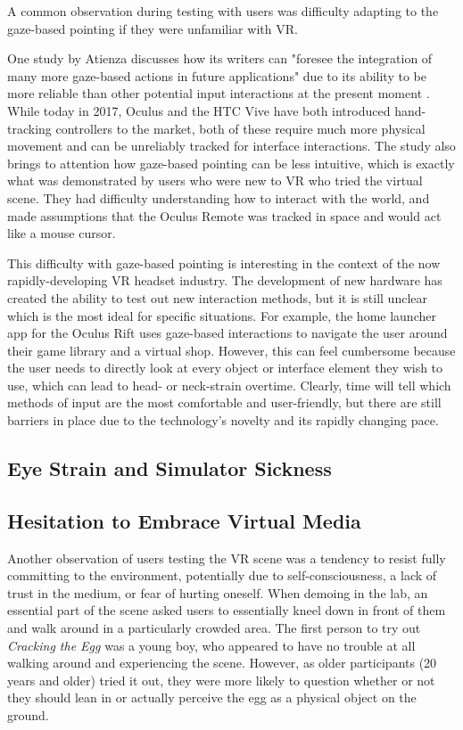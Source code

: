 \documentclass[10pt,twocolumn,letterpaper]{article}
\begin{document}
A common observation during testing with users was difficulty adapting to the gaze-based pointing if they were unfamiliar with VR.

One study by Atienza \etal discusses how its writers can "foresee the integration of many more gaze-based actions in future applications" due to its ability to be more reliable than other potential input interactions at the present moment \cite{7519387}. While today in 2017, Oculus and the HTC Vive have both introduced hand-tracking controllers to the market, both of these require much more physical movement and can be unreliably tracked for interface interactions. The study also brings to attention how  gaze-based pointing can be less intuitive, which is exactly what was demonstrated by users who were new to VR who tried the virtual scene. They had difficulty understanding how to interact with the world, and made assumptions that the Oculus Remote was tracked in space and would act like a mouse cursor.

This difficulty with gaze-based pointing is interesting in the context of the now rapidly-developing VR headset industry. The development of new hardware has created the ability to test out new interaction methods, but it is still unclear which is the most ideal for specific situations. For example, the home launcher app for the Oculus Rift uses gaze-based interactions to navigate the user around their game library and a virtual shop. However, this can feel cumbersome because the user needs to directly look at every object or interface element they wish to use, which can lead to head- or neck-strain overtime. Clearly, time will tell which methods of input are the most comfortable and user-friendly, but there are still barriers in place due to the technology's novelty and its rapidly changing pace.

\subsection{Eye Strain and Simulator Sickness}

\subsection{Hesitation to Embrace Virtual Media}

Another observation of users testing the VR scene was a tendency to resist fully committing to the environment, potentially due to self-consciousness, a lack of trust in the medium, or fear of hurting oneself. When demoing in the lab, an essential part of the scene asked users to essentially kneel down in front of them and walk around in a particularly crowded area. The first person to try out \textit{Cracking the Egg} was a young boy, who appeared to have no trouble at all walking around and experiencing the scene. However, as older participants (20 years and older) tried it out, they were more likely to question whether or not they should lean in or actually perceive the egg as a physical object on the ground.
\end{document}
